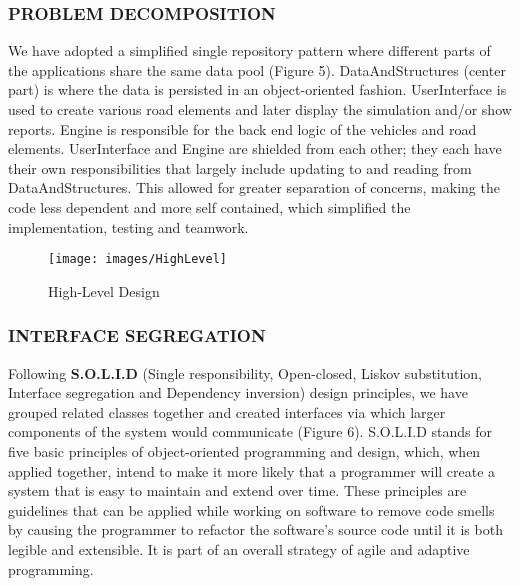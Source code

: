 \documentclass[11pt,a4paper]{article}
\begin{document}
  	\subsubsection{PROBLEM DECOMPOSITION}
  	We have adopted a simplified single repository pattern where different parts of the applications share the same data pool (Figure 5). DataAndStructures (center part) is where the data is persisted in an
  object-oriented fashion. UserInterface is used to create various road elements and later
  display the simulation and/or show reports. Engine is responsible for the back end logic of the vehicles and road
  elements. UserInterface and Engine are shielded from each other; they
  each have their own responsibilities that largely include updating to
  and reading from DataAndStructures. This allowed for greater
  separation of concerns, making the code less dependent and more self
  contained, which simplified the implementation, testing and teamwork.

  	
		\begin{figure}[h]
			\texttt{[image: images/HighLevel]}
			\caption{High-Level Design}
			\centering
		\end{figure}
  
  \subsubsection{INTERFACE SEGREGATION}
  Following \textbf{S.O.L.I.D} (Single responsibility, Open-closed,
  Liskov substitution, Interface segregation and Dependency inversion)\cite{wikiOOD}
  design principles, we have grouped related classes together and
  created interfaces via which larger components of the system would
  communicate (Figure 6). S.O.L.I.D stands for five basic principles of object-oriented
  programming and design, which, when applied together, intend to make
  it more likely that a programmer will create a system that is easy to
  maintain and extend over time. These principles are guidelines
  that can be applied while working on software to remove code smells
  by causing the programmer to refactor the software's source code
  until it is both legible and extensible. It is part of an overall
  strategy of agile and adaptive programming.\cite{robert03}
  
\end{document}
